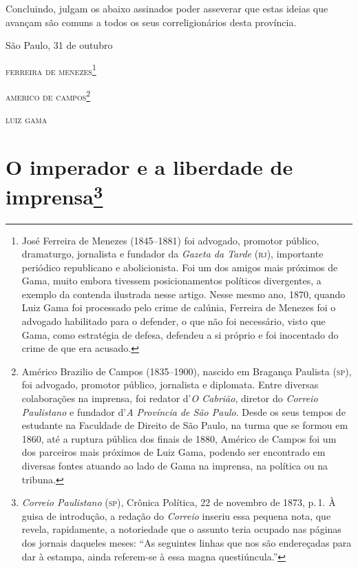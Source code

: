 Concluindo, julgam os abaixo assinados poder asseverar que estas ideias
que avançam são comuns a todos os seus correligionários desta província.

\begin{flushright}
São Paulo, 31 de outubro

\textsc{ferreira de menezes}\footnote{ José Ferreira de Menezes (1845--1881) foi
  advogado, promotor público, dramaturgo, jornalista e fundador da
  \emph{Gazeta da Tarde} (\textsc{rj}), importante periódico republicano e
  abolicionista. Foi um dos amigos mais próximos de Gama, muito embora
  tivessem posicionamentos políticos divergentes, a exemplo da contenda
  ilustrada nesse artigo. Nesse mesmo ano, 1870, quando Luiz Gama foi
  processado pelo crime de calúnia, Ferreira de Menezes foi o advogado
  habilitado para o defender, o que não foi necessário, visto que Gama,
  como estratégia de defesa, defendeu a si próprio e foi inocentado do
  crime de que era acusado.}

\textsc{americo de campos}\footnote{ Américo Brazilio de Campos (1835--1900),
  nascido em Bragança Paulista (\textsc{sp}), foi advogado, promotor público,
  jornalista e diplomata. Entre diversas colaborações na imprensa, foi
  redator d'\emph{O Cabrião}, diretor do \emph{Correio Paulistano} e
  fundador d'\emph{A Província de São Paulo}. Desde os seus tempos de
  estudante na Faculdade de Direito de São Paulo, na turma que se formou
  em 1860, até a ruptura pública dos finais de 1880, Américo de Campos
  foi um dos parceiros mais próximos de Luiz Gama, podendo ser
  encontrado em diversas fontes atuando ao lado de Gama na imprensa, na
  política ou na tribuna.}

\textsc{luiz gama}
\end{flushright}

\chapter{O imperador e a liberdade de imprensa\footnote{\emph{Correio Paulistano} (\textsc{sp}), Crônica Política,
  22 de novembro de 1873, p.\,1. À guisa de introdução, a redação do \emph{Correio}
  inseriu essa pequena nota, que revela, rapidamente, a notoriedade que
  o assunto teria ocupado nas páginas dos jornais daqueles meses: ``As
  seguintes linhas que nos são endereçadas para dar à estampa, ainda
  referem-se à essa magna questiúncula.''}} %

